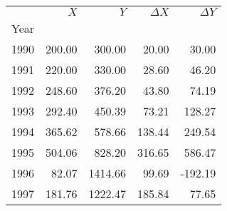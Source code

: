 \begin{tabular}{lrrrr}
\toprule
{} &                                              \(X\) &                                              \(Y\) &                                       \(\Delta X\) &                                       \(\Delta Y\) \\
Year &                                                    &                                                    &                                                    &                                                    \\
\midrule
1990 &                                             200.00 &                                             300.00 &                                              20.00 &                                              30.00 \\
1991 &                                             220.00 &                                             330.00 &                                              28.60 &                                              46.20 \\
1992 &                                             248.60 &                                             376.20 &                                              43.80 &                                              74.19 \\
1993 &                                             292.40 &                                             450.39 &                                              73.21 &                                             128.27 \\
1994 &                                             365.62 &                                             578.66 &                                             138.44 &                                             249.54 \\
1995 &                                             504.06 &                                             828.20 &                                             316.65 &                                             586.47 \\
1996 &                                              82.07 &                                            1414.66 &                                              99.69 &                                            -192.19 \\
1997 &                                             181.76 &                                            1222.47 &                                             185.84 &                                              77.65 \\

\end{tabular}
